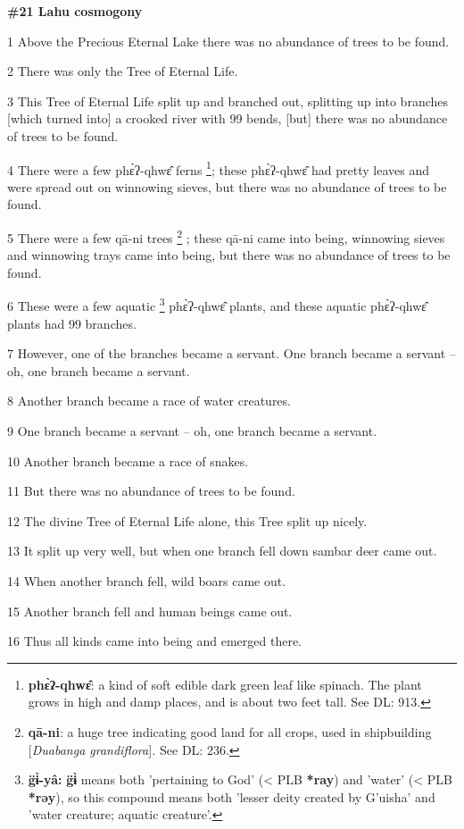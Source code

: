 
\textbf{\#21 Lahu cosmogony}

1 Above the Precious Eternal Lake there was no abundance of trees to be found.

2 There was only the Tree of Eternal Life.

3 This Tree of Eternal Life split up and branched out, splitting up into branches
[which turned into] a crooked river with 99 bends, [but] there was no abundance
of trees to be found.

4 There were a few phɛ̀ʔ-qhwɛ̂ ferns \footnote{\textbf{phɛ̀ʔ-qhwɛ̂}: a kind of soft edible dark green leaf like spinach. The plant grows in high and damp places, and is about two feet tall.  See  DL: 913.}; these phɛ̀ʔ-qhwɛ̂ had pretty
leaves and were spread out on winnowing sieves, but there was no abundance of trees
to be found.

5 There were a few qā-ni trees \footnote{\textbf{qā-ni}: a huge tree indicating good land for all crops, used in shipbuilding [\textit{Duabanga grandiflora}]\textit{. }See DL: 236.} ; these qā-ni came into being, winnowing
sieves and winnowing trays came into being, but there was no abundance of trees
to be found.

6 These were a few aquatic \footnote{\textbf{g̈ɨ̀-yâ: } \textbf{g̈ɨ̀  }means both 'pertaining to God' (< PLB \textbf{*ray}) and 'water' (< PLB \textbf{*rəy}), so this compound means both 'lesser deity created by G'uisha' and 'water creature; aquatic creature'.} phɛ̀ʔ-qhwɛ̂ plants, and these aquatic phɛ̀ʔ-qhwɛ̂
plants had 99 branches.

7 However, one of the branches became a servant. One branch became a servant --
oh, one branch became a servant.

8 Another branch became a race of water creatures.

9 One branch became a servant --  oh, one branch became a servant.

10 Another branch became a race of snakes.

11 But there was no abundance of trees to be found.

12 The divine Tree of Eternal Life alone, this Tree split up nicely.

13 It split up very well, but when one branch fell down sambar deer came out.

14 When another branch fell, wild boars came out.

15 Another branch fell and human beings came out.

16 Thus all kinds came into being and emerged there.

